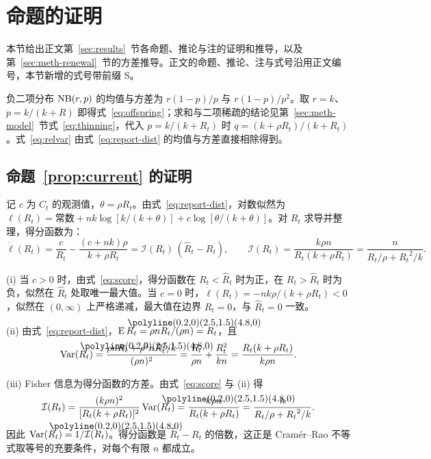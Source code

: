 \section{命题的证明}
\label{app:proofs}

本节给出正文第~\ref{sec:results}~节各命题、推论与注的证明和推导，以及第~\ref{sec:meth-renewal}~节的方差推导。正文的命题、推论、注与式号沿用正文编号，本节新增的式号带前缀 S。

负二项分布 $\operatorname{NB}(r,p)$ 的均值与方差为 $r(1-p)/p$ 与 $r(1-p)/p^2$。取 $r=k$、$p=k/(k+R)$ 即得式~\eqref{eq:offspring}；求和与二项稀疏的结论见第~\ref{sec:meth-model}~节式~\eqref{eq:thinning}，代入 $p=k/(k+R_t)$ 时 $q=(k+\rho R_t)/(k+R_t)$。式~\eqref{eq:relvar} 由式~\eqref{eq:report-dist} 的均值与方差直接相除得到。

\subsection{\texorpdfstring{命题~\ref{prop:current} 的证明}{命题 1 的证明}}

记 $c$ 为 $C_t$ 的观测值，$\theta=\rho R_t$。由式~\eqref{eq:report-dist}，对数似然为 $\ell(R_t)=\text{常数}+nk\log[k/(k+\theta)]+c\log[\theta/(k+\theta)]$。对 $R_t$ 求导并整理，得分函数为：
\begin{equation}
  \dot\ell(R_t)=\frac{c}{R_t}-\frac{(c+nk)\rho}{k+\rho R_t}
  =\mathcal I(R_t)\,(\widehat R_t-R_t),\qquad
  \mathcal I(R_t)=\frac{k\rho n}{R_t(k+\rho R_t)}=\frac{n}{R_t/\rho+{R_t}^2/k}.
  \label{eq:score}
\end{equation}

(i) 当 $c>0$ 时，由式~\eqref{eq:score}，得分函数在 $R_t<\widehat R_t$ 时为正，在 $R_t>\widehat R_t$ 时为负，似然在 $\widehat R_t$ 处取唯一最大值。当 $c=0$ 时，$\dot\ell(R_t)=-nk\rho/(k+\rho R_t)<0$，似然在 $(0,\infty)$ 上严格递减，最大值在边界 $R_t=0$，与 $\widehat R_t=0$ 一致。

(ii) 由式~\eqref{eq:report-dist}，$\E\widehat R_t=\rho nR_t/(\rho n)=R_t$，且
\begin{equation}
  \Var(\widehat R_t)=\frac{\rho nR_t+\rho^2nR_t^2/k}{(\rho n)^2}=\frac{R_t}{\rho n}+\frac{R_t^2}{kn}=\frac{R_t(k+\rho R_t)}{k\rho n}.
\end{equation}

(iii) Fisher 信息为得分函数的方差。由式~\eqref{eq:score} 与 (ii) 得
\begin{equation}
  \mathcal I(R_t)=\frac{(k\rho n)^2}{[R_t(k+\rho R_t)]^2}\Var(\widehat R_t)=\frac{k\rho n}{R_t(k+\rho R_t)}=\frac{n}{R_t/\rho+{R_t}^2/k}.
\end{equation}
因此 $\Var(\widehat R_t)=1/\mathcal I(R_t)$。得分函数是 $\widehat R_t-R_t$ 的倍数，这正是 Cramér--Rao 不等式取等号的充要条件\citep{casella2002statistical}，对每个有限 $n$ 都成立。

